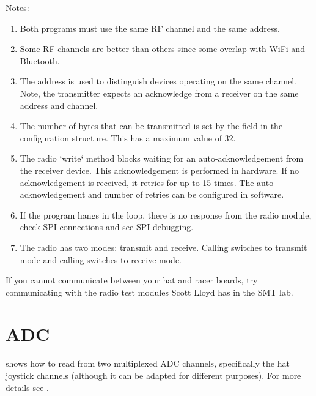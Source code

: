 Notes:
%
\begin{enumerate}
\item Both programs must use the same RF channel and the same address.

\item Some RF channels are better than others since some overlap with
  WiFi and Bluetooth.

\item The address is used to distinguish devices operating on the same
  channel. Note, the transmitter expects an acknowledge from a
  receiver on the same address and channel.

\item The number of bytes that can be transmitted is set by the
   field in the configuration structure.  This has a
  maximum value of 32.

\item The radio `write` method blocks waiting for an
  auto-acknowledgement from the receiver device. This acknowledgement
  is performed in hardware. If no acknowledgement is received, it
  retries for up to 15 times. The auto-acknowledgement and number of
  retries can be configured in software.

\item If the program hangs in the  loop, there is no
  response from the radio module, check SPI connections and see
  \hyperref[debugging-spi]{SPI debugging}.

\item The radio has two modes: transmit and receive.  Calling
   switches to transmit mode and calling
   switches to receive mode.

\end{enumerate}

If you cannot communicate between your hat and racer boards, try
communicating with the radio test modules Scott Lloyd has in the SMT
lab.


\section{ADC}
\label{ADC}

 shows
how to read from two multiplexed ADC channels, specifically the hat joystick
channels (although it can be adapted for different purposes).  For more details
see .

\inputminted{C}{../../src/test-apps/adc_usb_serial_test2/adc_usb_serial_test2.c}

